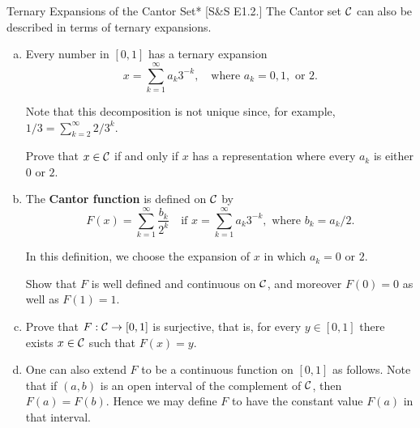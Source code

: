 \begin{problem}{Ternary Expansions of the Cantor Set}*
[S\&S E1.2.] The Cantor set \(\mathcal{C}\) can also be described in terms of ternary expansions.

\begin{enumerate}[(a)]
    \item Every number in \([0,1]\) has a ternary expansion
    \[
        x = \sum_{k=1}^\infty a_k 3^{-k}, \quad \text{where } a_k = 0, 1, \text{ or } 2.
    \]

    Note that this decomposition is not unique since, for example, \(1/3 = \sum_{k=2}^\infty 2/3^k\).

    Prove that \(x \in \mathcal{C}\) if and only if \(x\) has a representation where every \(a_k\) is either \(0\) or \(2\).
    
    \item The \textbf{Cantor function} is defined on \(\mathcal{C}\) by
    \[
        F(x) = \sum_{k=1}^\infty \frac{b_k}{2^k} \quad \text{if } x = \sum_{k=1}^\infty a_k 3^{-k}, \text{ where } b_k = a_k / 2.
    \]

    In this definition, we choose the expansion of \(x\) in which \(a_k = 0\) or \(2\).

    Show that \(F\) is well defined and continuous on \(\mathcal{C}\), and moreover \(F(0) = 0\) as well as \(F(1) = 1\).

    \item Prove that \(F : \mathcal{C} \to [0,1]\) is surjective, that is, for every \(y \in [0,1]\) there exists \(x \in \mathcal{C}\) such that \(F(x) = y\).

    \item One can also extend \(F\) to be a continuous function on \([0,1]\) as follows. Note that if \((a,b)\) is an open interval of the complement of \(\mathcal{C}\), then \(F(a) = F(b)\). Hence we may define \(F\) to have the constant value \(F(a)\) in that interval.
\end{enumerate}
\end{problem}

